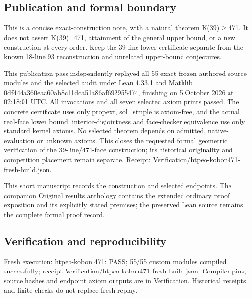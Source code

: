\documentclass[11pt,a4paper]{article}
\begin{document}
\subsection{Publication and formal boundary}
This is a concise exact-construction note, with a natural theorem K(39)\ensuremath{\geq}471. It does not assert K(39)=471, attainment of the general upper bound, or a new construction at every order. Keep the 39-line lower certificate separate from the known 18-line 93 reconstruction and unrelated upper-bound conjectures.

This publication pass independently replayed all 55 exact frozen authored source modules and the selected audit under Lean 4.33.1 and Mathlib 0df444a360eaa60ab8c11dca51a86af692955474, finishing on 5 October 2026 at 02:18:01 UTC. All invocations and all seven selected axiom prints passed. The concrete certificate uses only propext, sol\_simple is axiom-free, and the actual real-face lower bound, interior-disjointness and face-checker equivalence use only standard kernel axioms. No selected theorem depends on admitted, native-evaluation or unknown axioms. This closes the requested formal geometric verification of the 39-line/471-face construction; its historical originality and competition placement remain separate. Receipt: Verification/htpeo-kobon471-fresh-build.json.

{\small This short manuscript records the construction and selected endpoints. The companion Original results anthology contains the extended ordinary proof exposition and its explicitly stated premises; the preserved Lean source remains the complete formal proof record.\par}

\subsection{Verification and reproducibility}
Fresh execution: htpeo-kobon 471: PASS; 55/55 custom modules compiled successfully; receipt Verification/htpeo-kobon471-fresh-build.json. Compiler pins, source hashes and endpoint axiom outputs are in Verification. Historical receipts and finite checks do not replace fresh replay.
\end{document}
